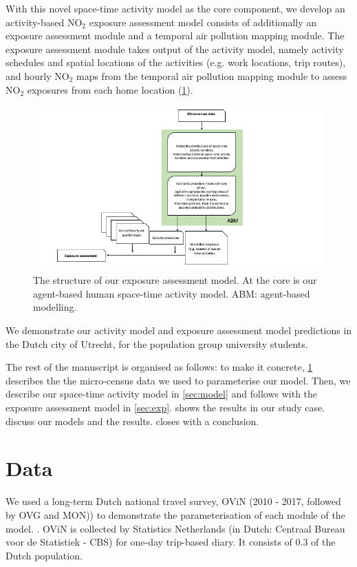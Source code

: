 \documentclass[]{article}
\begin{document}
With this novel space-time activity model as the core component, we develop an activity-based NO$_2$ exposure assessment model consists of additionally an exposure assessment module and a temporal air pollution mapping module. The exposure assessment module takes output of the activity model, namely activity schedules and spatial locations of the activities (e.g. work locations, trip routes), and hourly NO$_2$ maps from the temporal air pollution mapping module to assess NO$_2$ exposures from each home location (\cref{fig:expflow}).     

\begin{figure}
    \centering
    \includegraphics[width=\linewidth]{figure/exposureflow.png}
    \caption{The structure of our exposure assessment model. At the core is our agent-based human space-time activity model. ABM: agent-based modelling. }
    \label{fig:expflow}
\end{figure}
We demonstrate our activity model and exposure assessment model predictions in the Dutch city of Utrecht, for the population group university students.  

The rest of the manuscript is organised as follows: to make it concrete,  \cref{sec:data} describes the the micro-census data we used to parameterise our model. Then, we describe our space-time activity model in \cref{sec:model} and follows with the exposure assessment model in \cref{sec:exp}.  shows the results in our study case.  discuss our models and the results.  closes with a conclusion.

\section{Data}
\label{sec:data} 
We used a long-term Dutch national travel survey, OViN (2010 - 2017, followed by OVG and MON)) to demonstrate the parameterisation of each module of the model. . OViN is collected by Statistics Netherlands (in Dutch: Centraal Bureau voor de Statistiek - CBS) for one-day trip-based diary. It consists of 0.3 of the Dutch population. 
\end{document}
